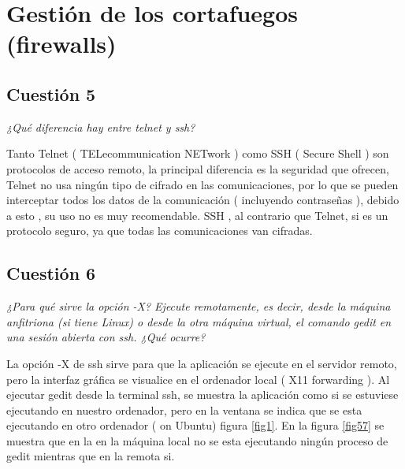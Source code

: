 \section{Gestión de los cortafuegos (firewalls)}
\subsection{Cuestión 5}
\textit{¿Qué diferencia hay entre telnet y ssh?}
\newline

Tanto Telnet ( TELecommunication NETwork ) como SSH ( Secure Shell ) son protocolos de acceso remoto, la principal diferencia es la seguridad que ofrecen, Telnet no usa ningún tipo de cifrado en las comunicaciones, por lo que se pueden interceptar todos los datos de la comunicación ( incluyendo contraseñas ), debido a esto , su uso no es muy recomendable. SSH , al contrario que Telnet, si es un protocolo seguro, ya que todas las comunicaciones van cifradas. \cite{sshtle}





\subsection{Cuestión 6}
\textit{¿Para qué sirve la opción -X? Ejecute remotamente, es decir, desde la máquina anfitriona (si tiene Linux) o desde la otra máquina virtual, el comando gedit en una sesión abierta con ssh. ¿Qué ocurre?}
\newline

La opción -X de ssh sirve para que la aplicación se ejecute en el servidor remoto, pero la interfaz gráfica se visualice en el ordenador local ( X11 forwarding ). \cite{sshx} Al ejecutar gedit desde la terminal ssh, se muestra la aplicación como si se estuviese ejecutando en nuestro ordenador, pero en la ventana se indica que se esta ejecutando en otro ordenador ( on Ubuntu) figura \ref{fig1}. En la figura \ref{fig57} se muestra que en la en la máquina local no se esta ejecutando ningún proceso de gedit mientras que en la remota si.

